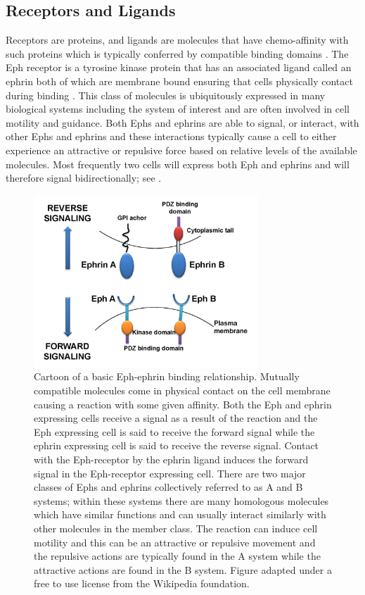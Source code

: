 \subsection{Receptors and Ligands} \label{section:ephephrins}
Receptors are proteins, and ligands are molecules that have chemo-affinity with such proteins which is typically conferred by compatible binding domains \cite{noauthor_undated-od}. The Eph receptor is a tyrosine kinase protein that has an associated ligand called an ephrin both of which are membrane bound ensuring that cells physically contact during binding \cite{Beckmann1994-gx, Hirai1987-cx}. This class of molecules is ubiquitously expressed in many biological systems including the system of interest and are often involved in cell motility and guidance\cite{noauthor_undated-od}. Both Ephs and ephrins are able to signal, or interact, with other Ephs and ephrins and these interactions typically cause a cell to either experience an attractive or repulsive force based on relative levels of the available molecules. Most frequently two cells will express both Eph and ephrins and will therefore signal bidirectionally; see \cite{eph-ephrin-web}.
\begin{figure}[hb!]
	\centering
	\includegraphics[width = 0.75\textwidth]{images/introduction/eph-ephrin-binding}
	\def\c{Cartoon of a basic Eph-ephrin binding relationship. }
	
	\caption[\c]{\label{fig:ephrinbinding} \c Mutually compatible molecules come in physical contact on the cell membrane causing a reaction with some given affinity. Both the Eph and ephrin expressing cells receive a signal as a result of the reaction and the Eph expressing cell is said to receive the forward signal while the ephrin expressing cell is said to receive the reverse signal. Contact with the Eph-receptor by the ephrin ligand induces the forward signal in the Eph-receptor expressing cell. There are two major classes of Ephs and ephrins collectively referred to as A and B systems; within these systems there are many homologous molecules which have similar functions and can usually interact similarly with other molecules in the member class. The reaction can induce cell motility and this can be an attractive or repulsive movement and the repulsive actions are typically found in the A system while the attractive actions are found in the B system. Figure adapted under a free to use license from the Wikipedia foundation. \cite{ephrinimage}} 
\end{figure}
